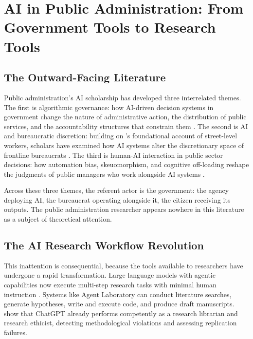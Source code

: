 \documentclass[12pt]{article}
\begin{document}
\section{AI in Public Administration: From Government Tools to Research Tools}

\subsection{The Outward-Facing Literature}

Public administration's AI scholarship has developed three interrelated themes. The first is
algorithmic governance: how AI-driven decision systems in government change the nature of
administrative action, the distribution of public services, and the accountability structures
that constrain them \citep{meijer2021algorithmicbureaucracy, diakopoulos2016accountability,
sun2023algorithmicdiscrimination}. The second is AI and bureaucratic discretion: building on
\citeauthor{lipsky1980street}'s \citeyearpar{lipsky1980street} foundational account of
street-level workers, scholars have examined how AI systems alter the discretionary space
of frontline bureaucrats \citep{bullock2019artificial, buffat2015street, evans2004streetlevel}.
The third is human-AI interaction in public sector decisions: how automation bias, skeuomorphism,
and cognitive off-loading reshape the judgments of public managers who work alongside AI
systems \citep{alon2023human, engstrom2020govtautomation}.

Across these three themes, the referent actor is the government: the agency deploying AI,
the bureaucrat operating alongside it, the citizen receiving its outputs. The public
administration researcher appears nowhere in this literature as a subject of theoretical
attention.

\subsection{The AI Research Workflow Revolution}

This inattention is consequential, because the tools available to researchers have undergone
a rapid transformation. Large language models with agentic capabilities now execute multi-step
research tasks with minimal human instruction \citep{gridach2025agenticscientific,
hasan2024integrating}. Systems like Agent Laboratory \citep{schmidgall2025agent}
can conduct literature searches, generate hypotheses, write and execute code, and produce
draft manuscripts. \citet{lehr2024chatgpt} show that ChatGPT already performs
competently as a research librarian and research ethicist, detecting methodological violations
and assessing replication failures.
\end{document}
